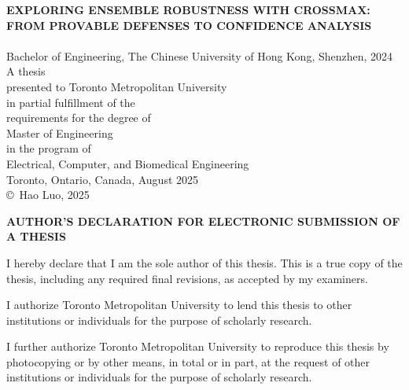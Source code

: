 \documentclass[10pt]{report}
\theoremstyle{definition}
\begin{document}

\begin{titlepage}
\centering
{\large \textbf{\MakeUppercase{Exploring Ensemble Robustness with CrossMax: From Provable Defenses to Confidence Analysis}}} \\[0.8cm]


 \\
Bachelor of Engineering, The Chinese University of Hong Kong, Shenzhen, 2024 \\ [2cm]

\large A thesis \\
presented to Toronto Metropolitan University \\ [0.5cm]
in partial fulfillment of the \\
requirements for the degree of \\

{\large Master of Engineering} \\
in the program of \\
Electrical, Computer, and Biomedical Engineering \\[2cm]

Toronto, Ontario, Canada, August 2025 \\[2cm]

\copyright\ Hao Luo, 2025



\end{titlepage}


\clearpage
{}   %
\setcounter{page}{2}    %



\begin{center}
\textbf{AUTHOR’S DECLARATION FOR ELECTRONIC SUBMISSION OF A THESIS}
\end{center}

\vspace{1em}

\indent I hereby declare that I am the sole author of this thesis. This is a true copy of the thesis, including  
any required final revisions, as accepted by my examiners.

\noindent I authorize Toronto Metropolitan University to lend this thesis to other institutions or individuals for the  
purpose of scholarly research.

\noindent I further authorize Toronto Metropolitan University to reproduce this thesis by photocopying or by other  
means, in total or in part, at the request of other institutions or individuals for the purpose of scholarly  
research.
\end{document}
